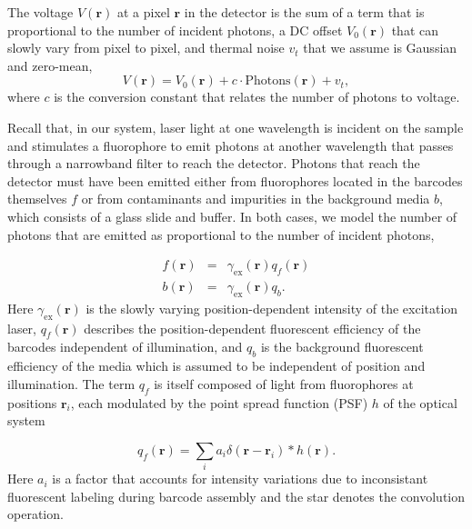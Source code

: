The voltage $V(\mathbf{r})$ at a pixel $\mathbf{r}$ in the detector is the sum of a term that is proportional to the number of incident photons, a DC offset $V_0(\mathbf{r})$ that can slowly vary from pixel to pixel, and thermal noise $v_t$ that we assume is Gaussian and zero-mean,
\begin{equation}\label{eq:V_of_r}
V(\mathbf{r})=V_0(\mathbf{r})+c \cdot \text{Photons}(\mathbf{r}) +v_t,
\end{equation}
where $c$ is the conversion constant that relates the number of photons to voltage. 


Recall that, in our system, laser light at one wavelength is incident on the sample and stimulates a fluorophore to emit photons at another wavelength that passes through a narrowband filter to reach the detector. Photons that reach the detector must have been emitted either from fluorophores located  in the barcodes themselves $f$ or from contaminants and impurities in the background media $b$, which consists of a glass slide and buffer.  In both cases, we model the number of photons that are emitted as proportional to the number of incident photons, 

\begin{eqnarray}\label{eq:f_and_b}
f(\mathbf{r})&=&\gamma_{\text{ex}}(\mathbf{r}) q_f(\mathbf{r})\\
b(\mathbf{r})&=&\gamma_{\text{ex}}(\mathbf{r}) q_b.
\end{eqnarray}
Here $\gamma_{\text{ex}}(\mathbf{r})$ is the slowly varying position-dependent intensity of the excitation laser,  $q_f(\mathbf{r})$ describes the position-dependent fluorescent efficiency of the barcodes independent of illumination, and $q_b$ is the background fluorescent efficiency of the media which is assumed to be independent of position and illumination. The term $q_f$ is itself composed of light from fluorophores at positions $\mathbf{r}_i$, each modulated by the point spread function (PSF) $h$ of the optical system

\begin{equation} \label{eq:withPSF}
q_f(\mathbf{r})=\sum_i a_i \delta(\mathbf{r}-\mathbf{r}_i) * h(\mathbf{r}).
\end{equation}
Here $a_i$ is a factor that accounts for intensity variations due to inconsistant fluorescent labeling  during barcode assembly and the star denotes the convolution operation.


